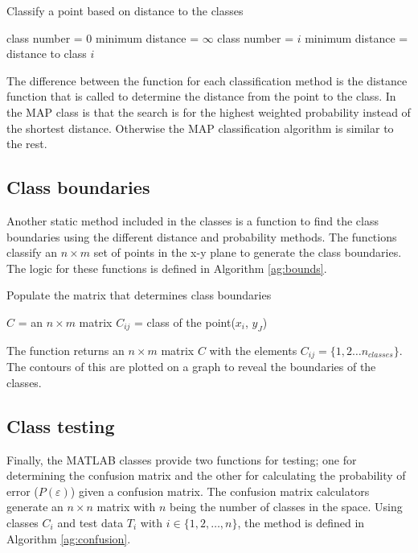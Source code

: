 \begin{algorithm}
\caption{Classify a point based on distance to the classes}
\label{ag:class}
\begin{algorithmic}
\STATE class number = 0
\STATE minimum distance = $\infty$
\STATE class number = $i$
\STATE minimum distance = distance to class $i$
\ENDIF
\ENDFOR
\end{algorithmic}
\end{algorithm}

The difference between the function for each classification method is the
distance function that is called to determine the distance from the point to
the class. In the MAP class is that the search is for the highest weighted
probability instead of the shortest distance. Otherwise the MAP classification algorithm is similar to the rest.

\subsection{Class boundaries}
Another static method included in the classes is a function to find the class
boundaries using the different distance and probability methods. The
functions classify an $n \times m$ set of points in the x-y plane to generate
the class boundaries. The logic for these functions is defined in Algorithm
\ref{ag:bounds}.

\begin{algorithm}
\caption{Populate the matrix that determines class boundaries}
\label{ag:bounds}
\begin{algorithmic}
\STATE $C$ = an $n \times m$ matrix
	$C_{ij}$ = class of the point($x_i$, $y_J$)
	\ENDFOR
\ENDFOR
\end{algorithmic}
\end{algorithm}

The function returns an $n \times m$ matrix $C$ with the elements $C_{ij} =
\{ 1,2 \ldots n_{classes} \}$. The contours of this are plotted on a graph to
reveal the boundaries of the classes.

\subsection{Class testing}
Finally, the MATLAB classes provide two functions for testing; one for
determining the confusion matrix and the other for calculating the probability
of error ($P(\varepsilon)$) given a confusion matrix. The confusion matrix
calculators generate an $n \times n$ matrix with $n$ being the number of
classes in the space. Using classes $C_i$ and test data $T_i$ with $i \in
\{1,2, \ldots, n\}$, the method is defined in Algorithm \ref{ag:confusion}.

